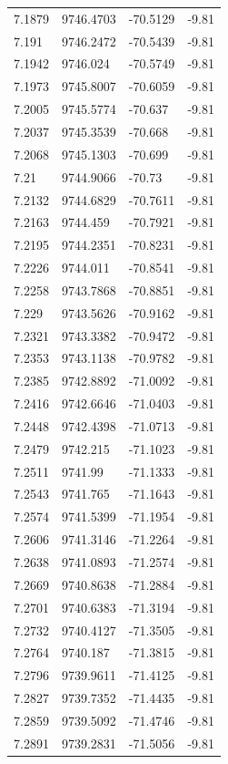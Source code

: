 \begin{table}[H]
\begin{tabular}{llll}
7.1879 & 9746.4703 & -70.5129 & -9.81 \\
7.191 & 9746.2472 & -70.5439 & -9.81 \\
7.1942 & 9746.024 & -70.5749 & -9.81 \\
7.1973 & 9745.8007 & -70.6059 & -9.81 \\
7.2005 & 9745.5774 & -70.637 & -9.81 \\
7.2037 & 9745.3539 & -70.668 & -9.81 \\
7.2068 & 9745.1303 & -70.699 & -9.81 \\
7.21 & 9744.9066 & -70.73 & -9.81 \\
7.2132 & 9744.6829 & -70.7611 & -9.81 \\
7.2163 & 9744.459 & -70.7921 & -9.81 \\
7.2195 & 9744.2351 & -70.8231 & -9.81 \\
7.2226 & 9744.011 & -70.8541 & -9.81 \\
7.2258 & 9743.7868 & -70.8851 & -9.81 \\
7.229 & 9743.5626 & -70.9162 & -9.81 \\
7.2321 & 9743.3382 & -70.9472 & -9.81 \\
7.2353 & 9743.1138 & -70.9782 & -9.81 \\
7.2385 & 9742.8892 & -71.0092 & -9.81 \\
7.2416 & 9742.6646 & -71.0403 & -9.81 \\
7.2448 & 9742.4398 & -71.0713 & -9.81 \\
7.2479 & 9742.215 & -71.1023 & -9.81 \\
7.2511 & 9741.99 & -71.1333 & -9.81 \\
7.2543 & 9741.765 & -71.1643 & -9.81 \\
7.2574 & 9741.5399 & -71.1954 & -9.81 \\
7.2606 & 9741.3146 & -71.2264 & -9.81 \\
7.2638 & 9741.0893 & -71.2574 & -9.81 \\
7.2669 & 9740.8638 & -71.2884 & -9.81 \\
7.2701 & 9740.6383 & -71.3194 & -9.81 \\
7.2732 & 9740.4127 & -71.3505 & -9.81 \\
7.2764 & 9740.187 & -71.3815 & -9.81 \\
7.2796 & 9739.9611 & -71.4125 & -9.81 \\
7.2827 & 9739.7352 & -71.4435 & -9.81 \\
7.2859 & 9739.5092 & -71.4746 & -9.81 \\
7.2891 & 9739.2831 & -71.5056 & -9.81 \\

\end{tabular}
\end{table}
